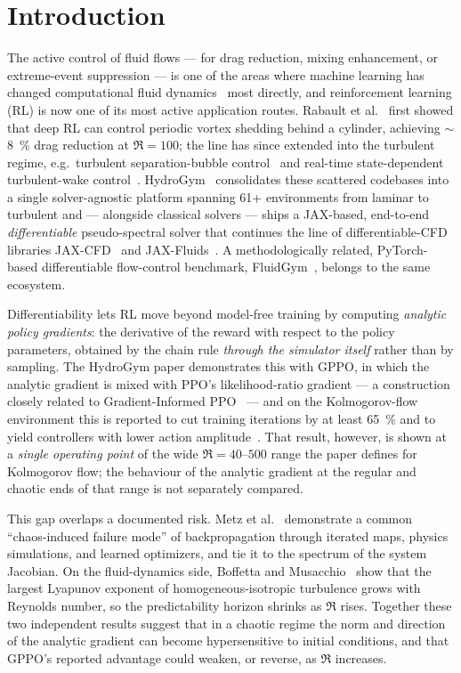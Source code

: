\section{Introduction}
\label{sec:intro}

The active control of fluid flows --- for drag reduction, mixing
enhancement, or extreme-event suppression --- is one of the areas where
machine learning has changed computational fluid
dynamics~\cite{brunton2020mlfluid,vinuesa2022enhancing} most directly, and
reinforcement learning (RL) is now one of its most active application
routes. Rabault et al.~\cite{rabault2019} first showed that deep RL can control periodic vortex
shedding behind a cylinder, achieving $\sim$\SI{8}{\percent} drag reduction
at $\Re=100$; the line has since extended into the turbulent regime, e.g.\
turbulent separation-bubble control~\cite{font2025} and real-time
state-dependent turbulent-wake control~\cite{react2026}.
HydroGym~\cite{hydrogym2026} consolidates these scattered codebases into a
single solver-agnostic platform spanning \num{61}+ environments from laminar
to turbulent and --- alongside classical solvers --- ships a JAX-based, end-to-end
\emph{differentiable} pseudo-spectral solver that continues the line of
differentiable-CFD libraries JAX-CFD~\cite{jaxcfd2021} and
JAX-Fluids~\cite{jaxfluids2022,jaxfluids2024}. A methodologically related,
PyTorch-based differentiable flow-control benchmark, FluidGym~\cite{fluidgym2026},
belongs to the same ecosystem.

Differentiability lets RL move beyond model-free training by computing
\emph{analytic policy gradients}: the derivative of the reward with respect
to the policy parameters, obtained by the chain rule \emph{through the
simulator itself} rather than by sampling. The HydroGym paper demonstrates
this with GPPO, in which the analytic gradient is mixed with PPO's
likelihood-ratio gradient --- a construction closely related to
Gradient-Informed PPO~\cite{gippo2023} --- and on the Kolmogorov-flow
environment this is reported to cut training iterations by at least
\SI{65}{\percent} and to yield controllers with lower action
amplitude~\cite{hydrogym2026}. That result, however, is shown at a
\emph{single operating point} of the wide $\Re=40$--$500$ range the paper
defines for Kolmogorov flow; the behaviour of the analytic gradient at the
regular and chaotic ends of that range is not separately compared.

This gap overlaps a documented risk. Metz et al.~\cite{metz2021} demonstrate
a common ``chaos-induced failure mode'' of backpropagation through iterated
maps, physics simulations, and learned optimizers, and tie it to the
spectrum of the system Jacobian. On the fluid-dynamics side, Boffetta and
Musacchio~\cite{boffetta2017} show that the largest Lyapunov exponent of
homogeneous-isotropic turbulence grows with Reynolds number, so the
predictability horizon shrinks as $\Re$ rises. Together these two
independent results suggest that in a chaotic regime the norm and direction
of the analytic gradient can become hypersensitive to initial conditions,
and that GPPO's reported advantage could weaken, or reverse, as $\Re$
increases.

